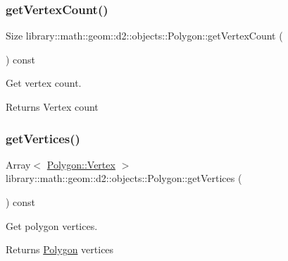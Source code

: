 \subsubsection{\texorpdfstring{get\+Vertex\+Count()}{getVertexCount()}}
{\footnotesize\ttfamily Size library\+::math\+::geom\+::d2\+::objects\+::\+Polygon\+::get\+Vertex\+Count (\begin{DoxyParamCaption}{ }\end{DoxyParamCaption}) const}



Get vertex count. 

\begin{DoxyReturn}{Returns}
Vertex count 
\end{DoxyReturn}
\mbox{\label{classlibrary_1_1math_1_1geom_1_1d2_1_1objects_1_1_polygon_ae73d59e0e0bb5d13bd69e2924e602e20}} 
\subsubsection{\texorpdfstring{get\+Vertices()}{getVertices()}}
{\footnotesize\ttfamily Array$<$ \hyperlink{classlibrary_1_1math_1_1geom_1_1d2_1_1objects_1_1_polygon_a1559cddbcb23d41f2be9e389b0ccd127}{Polygon\+::\+Vertex} $>$ library\+::math\+::geom\+::d2\+::objects\+::\+Polygon\+::get\+Vertices (\begin{DoxyParamCaption}{ }\end{DoxyParamCaption}) const}



Get polygon vertices. 

\begin{DoxyReturn}{Returns}
\hyperlink{classlibrary_1_1math_1_1geom_1_1d2_1_1objects_1_1_polygon}{Polygon} vertices 
\end{DoxyReturn}
\mbox{\label{classlibrary_1_1math_1_1geom_1_1d2_1_1objects_1_1_polygon_a29df028aaa9e1be74ae8ea1716cf99da}} 

